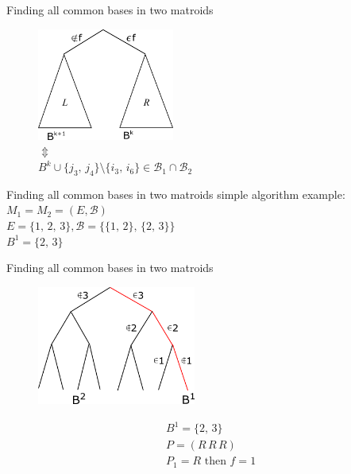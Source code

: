 \documentclass[11pt,xcolor=dvipsnames,table,dvipdfmx]{beamer}
\begin{document}
\begin{frame}{Finding all common bases in two matroids}
 \begin{figure}
  \centering
  \includegraphics[width=4.5cm]{text8631-16-2-9.png}\\
  $\Updownarrow$ \\
  $B^k \cup \{j_3,\,j_4\}\setminus \{i_3,\,i_6\} \in \mathcal{B}_1 \cap \mathcal{B}_2$
 \end{figure}
\end{frame}

\begin{frame}{Finding all common bases in two matroids}
 simple algorithm example:\\
 $M_1 = M_2 = (E, \mathcal{B})$\\
 $E = \{1,\,2,\,3\}, \mathcal{B} = \{\{1,\,2\},\,\{2,\,3\}\}$\\
 $B^1 = \{2,\,3\}$
\end{frame}

\begin{frame}{Finding all common bases in two matroids}
 \begin{figure}
  \centering
  \hspace{0.2cm}
  \includegraphics[width=5.2cm]{text4989.png}
 \end{figure}
 \begin{align*}
  &B^1 = \{2,\,3\}\\
  &P = (R\,R\,R)\\
  &P_1 = R \text{ then } f = 1
 \end{align*}
\end{frame}
\end{document}
